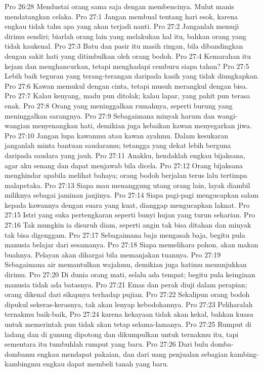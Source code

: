 Pro 26:28  Mendustai orang sama saja dengan membencinya. Mulut manis mendatangkan celaka.
Pro 27:1  Jangan membual tentang hari esok, karena engkau tidak tahu apa yang akan terjadi nanti.
Pro 27:2  Janganlah memuji dirimu sendiri; biarlah orang lain yang melakukan hal itu, bahkan orang yang tidak kaukenal.
Pro 27:3  Batu dan pasir itu masih ringan, bila dibandingkan dengan sakit hati yang ditimbulkan oleh orang bodoh.
Pro 27:4  Kemarahan itu kejam dan menghancurkan, tetapi menghadapi cemburu siapa tahan?
Pro 27:5  Lebih baik teguran yang terang-terangan daripada kasih yang tidak diungkapkan.
Pro 27:6  Kawan memukul dengan cinta, tetapi musuh merangkul dengan bisa.
Pro 27:7  Kalau kenyang, madu pun ditolak; kalau lapar, yang pahit pun terasa enak.
Pro 27:8  Orang yang meninggalkan rumahnya, seperti burung yang meninggalkan sarangnya.
Pro 27:9  Sebagaimana minyak harum dan wangi-wangian menyenangkan hati, demikian juga kebaikan kawan menyegarkan jiwa.
Pro 27:10  Jangan lupa kawanmu atau kawan ayahmu. Dalam kesukaran janganlah minta bantuan saudaramu; tetangga yang dekat lebih berguna daripada saudara yang jauh.
Pro 27:11  Anakku, hendaklah engkau bijaksana, agar aku senang dan dapat menjawab bila dicela.
Pro 27:12  Orang bijaksana menghindar apabila melihat bahaya; orang bodoh berjalan terus lalu tertimpa malapetaka.
Pro 27:13  Siapa mau menanggung utang orang lain, layak diambil miliknya sebagai jaminan janjinya.
Pro 27:14  Siapa pagi-pagi mengucapkan salam kepada kawannya dengan suara yang kuat, dianggap mengucapkan laknat.
Pro 27:15  Istri yang suka pertengkaran seperti bunyi hujan yang turun seharian.
Pro 27:16  Tak mungkin ia disuruh diam, seperti angin tak bisa ditahan dan minyak tak bisa digenggam.
Pro 27:17  Sebagaimana baja mengasah baja, begitu pula manusia belajar dari sesamanya.
Pro 27:18  Siapa memelihara pohon, akan makan buahnya. Pelayan akan dihargai bila memanjakan tuannya.
Pro 27:19  Sebagaimana air memantulkan wajahmu, demikian juga hatimu menunjukkan dirimu.
Pro 27:20  Di dunia orang mati, selalu ada tempat; begitu pula keinginan manusia tidak ada batasnya.
Pro 27:21  Emas dan perak diuji dalam perapian; orang dikenal dari sikapnya terhadap pujian.
Pro 27:22  Sekalipun orang bodoh dipukul sekeras-kerasnya, tak akan lenyap kebodohannya.
Pro 27:23  Peliharalah ternakmu baik-baik,
Pro 27:24  karena kekayaan tidak akan kekal, bahkan kuasa untuk memerintah pun tidak akan tetap selama-lamanya.
Pro 27:25  Rumput di ladang dan di gunung dipotong dan dikumpulkan untuk ternakmu itu, tapi sementara itu tumbuhlah rumput yang baru.
Pro 27:26  Dari bulu domba-dombamu engkau mendapat pakaian, dan dari uang penjualan sebagian kambing-kambingmu engkau dapat membeli tanah yang baru.
